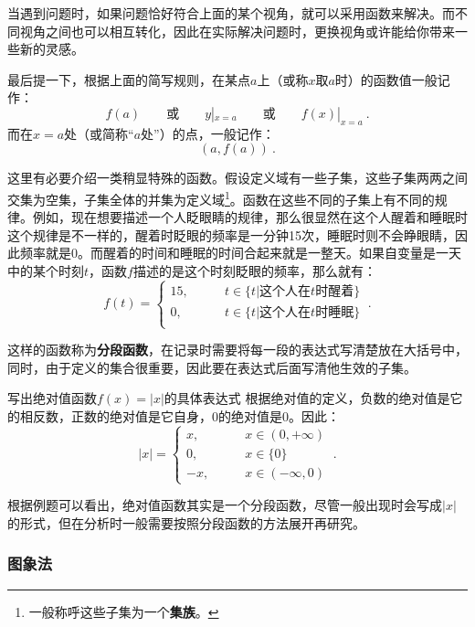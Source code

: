 当遇到问题时，如果问题恰好符合上面的某个视角，就可以采用函数来解决。而不同视角之间也可以相互转化，因此在实际解决问题时，更换视角或许能给你带来一些新的灵感。

最后提一下，根据上面的简写规则，在某点$a$上（或称$x$取$a$时）的函数值一般记作：
\begin{equation}
f(a)\qquad\text{或}\qquad y|_{x=a}\qquad\text{或}\qquad f(x)|_{x=a}~.
\end{equation}
而在$x=a$处（或简称“$a$处”）的点，一般记作：
\begin{equation}
(a,f(a))~.
\end{equation}

这里有必要介绍一类稍显特殊的函数。假设定义域有一些子集，这些子集两两之间交集为空集，子集全体的并集为定义域\footnote{一般称呼这些子集为一个\textbf{集族}。}。函数在这些不同的子集上有不同的规律。例如，现在想要描述一个人眨眼睛的规律，那么很显然在这个人醒着和睡眠时这个规律是不一样的，醒着时眨眼的频率是一分钟15次，睡眠时则不会睁眼睛，因此频率就是0。而醒着的时间和睡眠的时间合起来就是一整天。如果自变量是一天中的某个时刻$t$，函数$f$描述的是这个时刻眨眼的频率，那么就有：
\begin{equation}
f(t)=
\begin{cases}
15,\qquad&t\in\{t|\text{这个人在}t\text{时醒着}\}\\
0,\qquad&t\in\{t|\text{这个人在}t\text{时睡眠}\}\\
\end{cases}~.
\end{equation}

这样的函数称为\textbf{分段函数}，在记录时需要将每一段的表达式写清楚放在大括号中，同时，由于定义的集合很重要，因此要在表达式后面写清他生效的子集。
\begin{example}{写出绝对值函数$f(x)=|x|$的具体表达式}
根据绝对值的定义，负数的绝对值是它的相反数，正数的绝对值是它自身，0的绝对值是0。因此：
\begin{equation}
|x|=
\begin{cases}
x,\qquad&x\in(0,+\infty)\\
0,\qquad&x\in\{0\}\\
-x,\qquad&x\in(-\infty,0)
\end{cases}~.
\end{equation}
\end{example}

根据例题可以看出，绝对值函数其实是一个分段函数，尽管一般出现时会写成$|x|$的形式，但在分析时一般需要按照分段函数的方法展开再研究。

\subsubsection{图象法}

